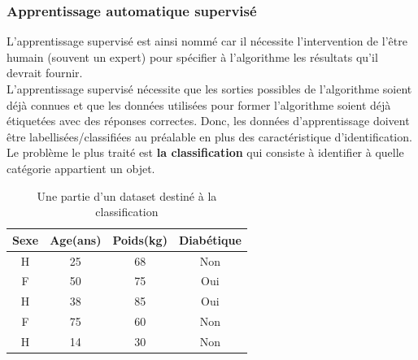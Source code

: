 \subsubsection{Apprentissage automatique supervisé}
L'apprentissage supervisé est ainsi nommé car il nécessite l'intervention de l'être humain (souvent un expert) pour spécifier à l'algorithme les résultats qu'il devrait fournir.\\
L'apprentissage supervisé nécessite que les sorties possibles de l'algorithme soient déjà connues et que les données utilisées pour former l'algorithme soient déjà étiquetées avec des réponses correctes. Donc, les données d'apprentissage doivent être labellisées/classifiées au préalable en plus des caractéristique d'identification.\\
Le problème le plus traité est \textbf{la classification} qui consiste à identifier à quelle catégorie appartient un objet.\\
\begin{table}[H]
    \begin{center}
        \begin{tabular}{|c|c|c|c|}
            \hline
            \textbf{Sexe} & \textbf{Age}(ans) & \textbf{Poids}(kg) & \textbf{Diabétique}  \\
            \hline
            H  &  25 & 68  &  Non\\
            \hline
            F  &  50 & 75  &  Oui\\
            \hline
            H  &  38 & 85 &   Oui\\
            \hline
            F  &  75 & 60 &   Non\\
            \hline
            H  &  14 & 30  &  Non\\
            \hline
        \end{tabular}
    \end{center}
\caption{Une partie d'un dataset destiné à la classification}
\end{table}

